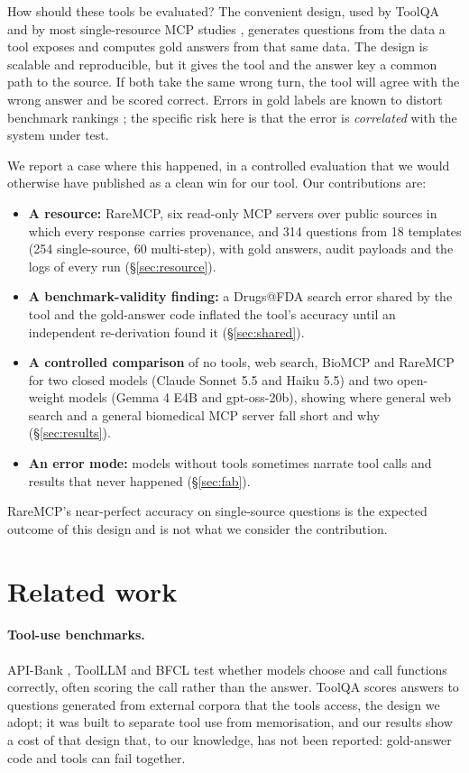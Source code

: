 \documentclass[11pt]{article}
\begin{document}
How should these tools be evaluated? The convenient design, used by ToolQA \citep{toolqa} and by most single-resource MCP studies \citep{m3, disphasedb, ehrmcp}, generates questions from the data a tool exposes and computes gold answers from that same data. The design is scalable and reproducible, but it gives the tool and the answer key a common path to the source. If both take the same wrong turn, the tool will agree with the wrong answer and be scored correct. Errors in gold labels are known to distort benchmark rankings \citep{northcutt2021, gema2025}; the specific risk here is that the error is \emph{correlated} with the system under test.

We report a case where this happened, in a controlled evaluation that we would otherwise have published as a clean win for our tool. Our contributions are:
\begin{itemize}
\setlength\itemsep{0pt}
\item \textbf{A resource:} RareMCP, six read-only MCP servers over public sources in which every response carries provenance, and 314 questions from 18 templates (254 single-source, 60 multi-step), with gold answers, audit payloads and the logs of every run (\S\ref{sec:resource}).
\item \textbf{A benchmark-validity finding:} a Drugs@FDA search error shared by the tool and the gold-answer code inflated the tool's accuracy until an independent re-derivation found it (\S\ref{sec:shared}).
\item \textbf{A controlled comparison} of no tools, web search, BioMCP \citep{biomcp} and RareMCP for two closed models (Claude Sonnet 5.5 and Haiku 5.5) and two open-weight models (Gemma 4 E4B and gpt-oss-20b), showing where general web search and a general biomedical MCP server fall short and why (\S\ref{sec:results}).
\item \textbf{An error mode:} models without tools sometimes narrate tool calls and results that never happened (\S\ref{sec:fab}).
\end{itemize}
RareMCP's near-perfect accuracy on single-source questions is the expected outcome of this design and is not what we consider the contribution.

\section{Related work}

\paragraph{Tool-use benchmarks.} API-Bank \citep{apibank}, ToolLLM \citep{toolllm} and BFCL \citep{bfcl} test whether models choose and call functions correctly, often scoring the call rather than the answer. ToolQA \citep{toolqa} scores answers to questions generated from external corpora that the tools access, the design we adopt; it was built to separate tool use from memorisation, and our results show a cost of that design that, to our knowledge, has not been reported: gold-answer code and tools can fail together.
\end{document}
